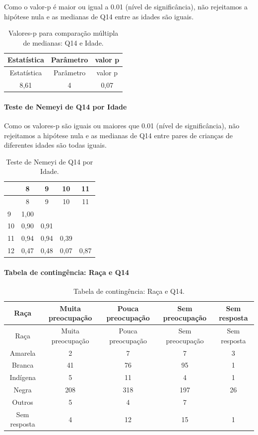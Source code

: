 \documentclass[]{article}
\let\oldparagraph\paragraph
\renewcommand{\paragraph}[1]{\oldparagraph{#1}\mbox{}}
\begin{document}
Como o valor-p é maior ou igual a 0.01 (nível de significância), não rejeitamos a hipótese nula e as medianas de Q14 entre as idades são iguais.

\begin{longtable}[]{@{}ccc@{}}
\caption{\label{tab:unnamed-chunk-40}Valores-p para comparação múltipla de medianas: Q14 e Idade.}\tabularnewline
\toprule
Estatística & Parâmetro & valor p\tabularnewline
\midrule
\endfirsthead
\toprule
Estatística & Parâmetro & valor p\tabularnewline
\midrule
\endhead
8,61 & 4 & 0,07\tabularnewline
\bottomrule
\end{longtable}

\hypertarget{teste-de-nemeyi-de-q14-por-idade}{%
\paragraph{Teste de Nemeyi de Q14 por Idade}\label{teste-de-nemeyi-de-q14-por-idade}}

Como os valores-p são iguais ou maiores que 0.01 (nível de significância), não rejeitamos a hipótese nula e as medianas de Q14 entre pares de crianças de diferentes idades são todas iguais.

\begin{longtable}[]{@{}lcccc@{}}
\caption{\label{tab:unnamed-chunk-42}Teste de Nemeyi de Q14 por Idade.}\tabularnewline
\toprule
& 8 & 9 & 10 & 11\tabularnewline
\midrule
\endfirsthead
\toprule
& 8 & 9 & 10 & 11\tabularnewline
\midrule
\endhead
9 & 1,00 & & &\tabularnewline
10 & 0,90 & 0,91 & &\tabularnewline
11 & 0,94 & 0,94 & 0,39 &\tabularnewline
12 & 0,47 & 0,48 & 0,07 & 0,87\tabularnewline
\bottomrule
\end{longtable}

\cleardoublepage

\hypertarget{tabela-de-continguxeancia-rauxe7a-e-q14}{%
\paragraph{Tabela de contingência: Raça e Q14}\label{tabela-de-continguxeancia-rauxe7a-e-q14}}

\begin{longtable}[]{@{}ccccc@{}}
\caption{\label{tab:unnamed-chunk-43}Tabela de contingência: Raça e Q14.}\tabularnewline
\toprule
Raça & Muita preocupação & Pouca preocupação & Sem preocupação & Sem resposta\tabularnewline
\midrule
\endfirsthead
\toprule
Raça & Muita preocupação & Pouca preocupação & Sem preocupação & Sem resposta\tabularnewline
\midrule
\endhead
Amarela & 2 & 7 & 7 & 3\tabularnewline
Branca & 41 & 76 & 95 & 1\tabularnewline
Indígena & 5 & 11 & 4 & 1\tabularnewline
Negra & 208 & 318 & 197 & 26\tabularnewline
Outros & 5 & 4 & 7 &\tabularnewline
Sem resposta & 4 & 12 & 15 & 1\tabularnewline
\bottomrule
\end{longtable}
\end{document}
